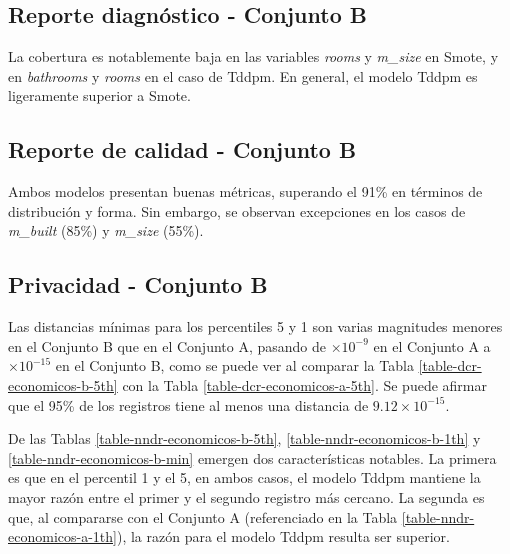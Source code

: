 

\newpage
\subsection{Reporte diagnóstico - Conjunto B}
La cobertura es notablemente baja en las variables \emph{rooms} y \emph{m\_size} en Smote, y en \emph{bathrooms} y \emph{rooms} en el caso de Tddpm. En general, el modelo Tddpm es ligeramente superior a Smote.



\newpage
\subsection{Reporte de calidad - Conjunto B}
Ambos modelos presentan buenas métricas, superando el 91\% en términos de distribución y forma. Sin embargo, se observan excepciones en los casos de \emph{m\_built} (85\%) y \emph{m\_size} (55\%).


\newpage
\subsection{Privacidad - Conjunto B}
Las distancias mínimas para los percentiles 5 y 1 son varias magnitudes menores en el Conjunto B que en el Conjunto A, pasando de $\times 10^{-9}$ en el Conjunto A a $\times 10^{-15}$ en el Conjunto B, como se puede ver al comparar la Tabla \ref{table-dcr-economicos-b-5th} con la Tabla \ref{table-dcr-economicos-a-5th}. Se puede afirmar que el 95\% de los registros tiene al menos una distancia de $9.12 \times 10^{-15}$.




\newpage
De las Tablas \ref{table-nndr-economicos-b-5th}, \ref{table-nndr-economicos-b-1th} y \ref{table-nndr-economicos-b-min} emergen dos características notables. La primera es que en el percentil 1 y el 5, en ambos casos, el modelo Tddpm mantiene la mayor razón entre el primer y el segundo registro más cercano. La segunda es que, al compararse con el Conjunto A (referenciado en la Tabla \ref{table-nndr-economicos-a-1th}), la razón para el modelo Tddpm resulta ser superior.



\newpage
